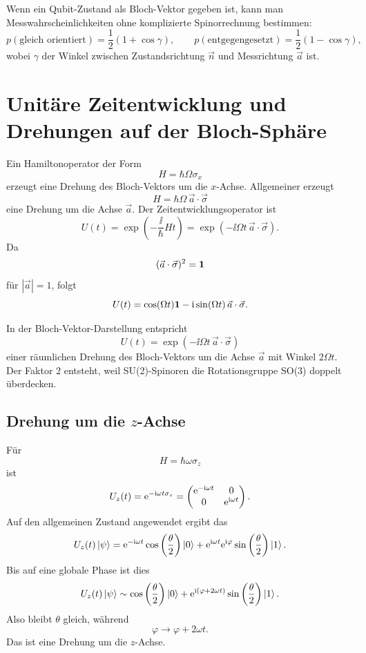 \begin{examtipbox}
Wenn ein Qubit-Zustand als Bloch-Vektor gegeben ist, kann man Messwahrscheinlichkeiten ohne komplizierte Spinorrechnung bestimmen:
\[
    p(\text{gleich orientiert})=\frac12(1+\cos\gamma),
    \qquad
    p(\text{entgegengesetzt})=\frac12(1-\cos\gamma),
\]
wobei \(\gamma\) der Winkel zwischen Zustandsrichtung \(\vec n\) und Messrichtung \(\vec a\) ist.
\end{examtipbox}

\section{Unitäre Zeitentwicklung und Drehungen auf der Bloch-Sphäre}

Ein Hamiltonoperator der Form
\[
    H=\hbar\Omega\sigma_x
\]
erzeugt eine Drehung des Bloch-Vektors um die \(x\)-Achse. Allgemeiner erzeugt
\[
    H=\hbar\Omega\,\vec a\cdot\vec\sigma
\]
eine Drehung um die Achse \(\vec a\). Der Zeitentwicklungsoperator ist
\[
    U(t)=\exp\left(-\frac{\ii}{\hbar}Ht\right)
    =\exp\left(-\ii\Omega t\,\vec a\cdot\vec\sigma\right).
\]
Da
\[
    (\vec a\cdot\vec\sigma)^2=\mathbf{1}
\]
für \(|\vec a|=1\), folgt
\[
    U(t)=\cos(\Omega t)\mathbf{1}
    -\mathrm{i}\sin(\Omega t)\,\vec a\cdot\vec\sigma.
\]

\begin{notebox}
In der Bloch-Vektor-Darstellung entspricht
\[
    U(t)=\exp(-\ii\Omega t\,\vec a\cdot\vec\sigma)
\]
einer räumlichen Drehung des Bloch-Vektors um die Achse \(\vec a\) mit Winkel \(2\Omega t\). Der Faktor \(2\) entsteht, weil SU(2)-Spinoren die Rotationsgruppe SO(3) doppelt überdecken.
\end{notebox}

\subsection{Drehung um die \(z\)-Achse}

Für
\[
    H=\hbar\omega\sigma_z
\]
ist
\[
    U_z(t)=\mathrm{e}^{-\mathrm{i}\omega t\sigma_z}
    =\begin{pmatrix}
        \mathrm{e}^{-\mathrm{i}\omega t}&0\\
        0&\mathrm{e}^{\mathrm{i}\omega t}
    \end{pmatrix}.
\]
Auf den allgemeinen Zustand angewendet ergibt das
\[
    U_z(t)\left|\psi\right\rangle
    =\mathrm{e}^{-\mathrm{i}\omega t}\cos\left(\frac\theta2\right)\left|0\right\rangle
    +\mathrm{e}^{\mathrm{i}\omega t}\mathrm{e}^{\mathrm{i}\varphi}\sin\left(\frac\theta2\right)\left|1\right\rangle.
\]
Bis auf eine globale Phase ist dies
\[
    U_z(t)\left|\psi\right\rangle
    \sim
    \cos\left(\frac\theta2\right)\left|0\right\rangle
    +\mathrm{e}^{\mathrm{i}(\varphi+2\omega t)}\sin\left(\frac\theta2\right)\left|1\right\rangle.
\]
Also bleibt \(\theta\) gleich, während
\[
    \varphi\longrightarrow \varphi+2\omega t.
\]
Das ist eine Drehung um die \(z\)-Achse.

